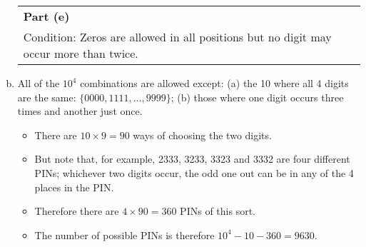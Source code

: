 \documentclass[a4paper,12pt]{article}
\begin{document}
\begin{enumerate}[(a)]
\begin{table}[ht!]
 \centering
 \begin{tabular}{|p{15cm}|}
 \hline
\noindent \textbf{Part (e)}\\
Condition: Zeros are allowed in all positions but no digit may occur more than twice.
\\ \hline

  \end{tabular}

\end{table}
\item All of the $10^4$ combinations are allowed except:
(a) the 10 where all 4 digits are the same: $\{0000, 1111, \ldots, 9999\}$;
(b) those where one digit occurs three times and another just once.  \begin{itemize}
\item There are $10 \times 9 = 90$ ways of choosing the two digits. 
\item But note that, for example, 2333, 3233, 3323 and 3332 are four different PINs; whichever two digits occur, the odd one out can be in any of the 4 places in the PIN. \item Therefore there are $4 \times 90 = 360$ PINs of this sort.
\item The number of possible PINs is therefore $10^4 - 10 - 360 = 9630$.
\end{itemize}

\end{enumerate}
\end{document}
